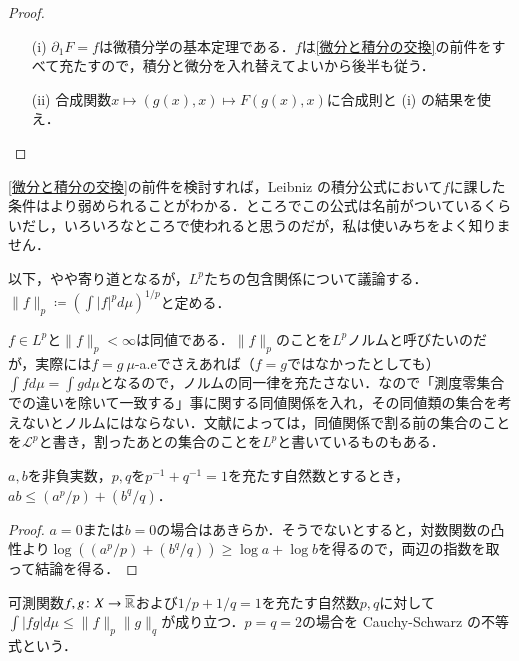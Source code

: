 \begin{proof}
\leavevmode
\begin{enumerate}
\item[(i)] $\partial_1 F = f$は微積分学の基本定理である．$f$は\cref{微分と積分の交換}の前件をすべて充たすので，積分と微分を入れ替えてよいから後半も従う．
\item[(ii)] 合成関数$x \mapsto (g(x), x) \mapsto F(g(x), x)$に合成則と (i) の結果を使え．
\end{enumerate}
\end{proof}

\begin{que}
\cref{微分と積分の交換}の前件を検討すれば，Leibniz の積分公式において$f$に課した条件はより弱められることがわかる．ところでこの公式は名前がついているくらいだし，いろいろなところで使われると思うのだが，私は使いみちをよく知りません．
\end{que}

以下，やや寄り道となるが，$L^p$たちの包含関係について議論する．$\|f\|_p \coloneqq \left(\int |f|^p d\mu\right)^{1/p}$と定める．

\begin{que}
$f \in L^p$と$\|f\|_p < \infty$は同値である．$\|f\|_p$のことを$L^p$ノルムと呼びたいのだが，実際には$f=g \ \mu$-a.eでさえあれば（$f=g$ではなかったとしても）$\int f d\mu = \int g d\mu$となるので，ノルムの同一律を充たさない．なので「測度零集合での違いを除いて一致する」事に関する同値関係を入れ，その同値類の集合を考えないとノルムにはならない．文献によっては，同値関係で割る前の集合のことを$\mathcal{L}^p$と書き，割ったあとの集合のことを$L^p$と書いているものもある．
\end{que}

\begin{thm}
$a,b$を非負実数，$p,q$を$p^{-1}+ q^{-1}=1$を充たす自然数とするとき，$ab \leq (a^p/p) + (b^q/q)$．
\end{thm}

\begin{proof}
$a=0$または$b=0$の場合はあきらか．そうでないとすると，対数関数の凸性より$\log((a^p/p) + (b^q/q)) \geq \log a + \log b$を得るので，両辺の指数を取って結論を得る．
\end{proof}

\begin{thm}
可測関数$f,g \colon X \to \overline{\mathbb{R}}$および$1/p+1/q=1$を充たす自然数$p,q$に対して$\int |fg| d\mu \leq \|f\|_p \|g\|_q$が成り立つ．$p=q=2$の場合を Cauchy-Schwarz の不等式という．
\end{thm}

